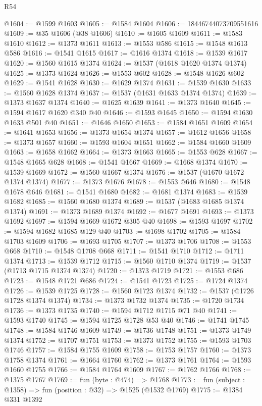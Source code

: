 \begin{lexlean}{R54}
\begin{coremodule}
{{{{{{{{{{{{{{{{{{{{{{{{{{{{{{{{{{{{{{{{{{{{{{{{{{@1604 := @1599 @1603
@1605 := @1584 @1604
@1606 := 18446744073709551616
@1609 := @35 @1606 (@38 @1606)
@1610 := @1605 @1609
@1611 := @1583 @1610
@1612 := @1373 @1611
@1613 := @1553 @586
@1615 := @1548 @1613 @586
@1616 := @1541 @1615
@1617 := @1616 @1374
@1618 := @1539 @1617
@1620 := @1560 @1615 @1374
@1624 := @1537 (@1618 @1620 @1374 @1374)
@1625 := @1373 @1624
@1626 := @1553 @602
@1628 := @1548 @1626 @602
@1629 := @1541 @1628
@1630 := @1629 @1374
@1631 := @1539 @1630
@1633 := @1560 @1628 @1374
@1637 := @1537 (@1631 @1633 @1374 @1374)
@1639 := @1373 @1637 @1374
@1640 := @1625 @1639
@1641 := @1373 @1640
@1645 := @1594 @1617 @1620 @340 @40
@1646 := @1593 @1645
@1650 := @1594 @1630 @1633 @501 @40
@1651 := @1646 @1650
@1653 := @1584 @1651 @1609
@1654 := @1641 @1653
@1656 := @1373 @1654 @1374
@1657 := @1612 @1656
@1658 := @1373 @1657
@1660 := @1593 @1604 @1651
@1662 := @1584 @1660 @1609
@1663 := @1658 @1662
@1664 := @1373 @1663
@1665 := @1553 @628
@1667 := @1548 @1665 @628
@1668 := @1541 @1667
@1669 := @1668 @1374
@1670 := @1539 @1669
@1672 := @1560 @1667 @1374
@1676 := @1537 (@1670 @1672 @1374 @1374)
@1677 := @1373 @1676
@1678 := @1553 @646
@1680 := @1548 @1678 @646
@1681 := @1541 @1680
@1682 := @1681 @1374
@1683 := @1539 @1682
@1685 := @1560 @1680 @1374
@1689 := @1537 (@1683 @1685 @1374 @1374)
@1691 := @1373 @1689 @1374
@1692 := @1677 @1691
@1693 := @1373 @1692
@1697 := @1594 @1669 @1672 @305 @40
@1698 := @1593 @1697
@1702 := @1594 @1682 @1685 @129 @40
@1703 := @1698 @1702
@1705 := @1584 @1703 @1609
@1706 := @1693 @1705
@1707 := @1373 @1706
@1708 := @1553 @668
@1710 := @1548 @1708 @668
@1711 := @1541 @1710
@1712 := @1711 @1374
@1713 := @1539 @1712
@1715 := @1560 @1710 @1374
@1719 := @1537 (@1713 @1715 @1374 @1374)
@1720 := @1373 @1719
@1721 := @1553 @686
@1723 := @1548 @1721 @686
@1724 := @1541 @1723
@1725 := @1724 @1374
@1726 := @1539 @1725
@1728 := @1560 @1723 @1374
@1732 := @1537 (@1726 @1728 @1374 @1374)
@1734 := @1373 @1732 @1374
@1735 := @1720 @1734
@1736 := @1373 @1735
@1740 := @1594 @1712 @1715 @71 @40
@1741 := @1593 @1740
@1745 := @1594 @1725 @1728 @53 @40
@1746 := @1741 @1745
@1748 := @1584 @1746 @1609
@1749 := @1736 @1748
@1751 := @1373 @1749 @1374
@1752 := @1707 @1751
@1753 := @1373 @1752
@1755 := @1593 @1703 @1746
@1757 := @1584 @1755 @1609
@1758 := @1753 @1757
@1760 := @1373 @1758 @1374
@1761 := @1664 @1760
@1762 := @1373 @1761
@1764 := @1593 @1660 @1755
@1766 := @1584 @1764 @1609
@1767 := @1762 @1766
@1768 := @1375 @1767
@1769 := fun (byte : @474) => @1768
@1773 := fun (subject : @1358) => fun (position : @32) => @1525 (@1532 @1769)
@1775 := @1384 @331 @1392
}}}}}}}}}}}}}}}}}}}}}}}}}}}}}}}}}}}}}}}}}}}}}}}}}}
\end{coremodule}
\end{lexlean}
